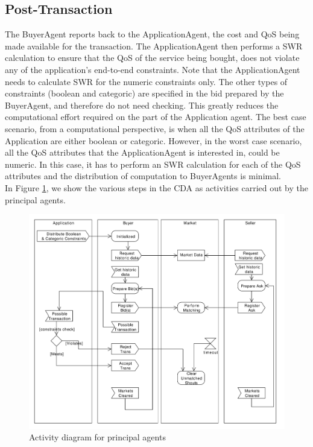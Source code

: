 \documentclass[10pt,journal,compsoc]{IEEEtran}
\begin{document}
\subsection{Post-Transaction}
The BuyerAgent reports back to the ApplicationAgent, the cost and QoS being made available for the transaction. The ApplicationAgent then performs a SWR calculation to ensure that the QoS of the service being bought, does not violate any of the application's end-to-end constraints. Note that the ApplicationAgent needs to calculate SWR for the numeric constraints only. The other types of constraints (boolean and categoric) are specified in the bid prepared by the BuyerAgent, and therefore do not need checking. This greatly reduces the computational effort required on the part of the Application agent. The best case scenario, from a computational perspective, is when all the QoS attributes of the Application are either boolean or categoric. However, in the worst case scenario, all the QoS attributes that the ApplicationAgent is  interested in, could be numeric. In this case, it has to perform an SWR calculation for each of the QoS attributes and the distribution of computation to BuyerAgents is minimal.\\

In Figure \ref{fig:cda_activity_diagram}, we show the various steps in the CDA  as activities carried out by the principal agents.
 
 \begin{figure}[h]
	\centering
	\includegraphics[scale=0.3]{drawings/CDA_Activity_Diagram.pdf}
	\caption{Activity diagram for principal agents}
	\label{fig:cda_activity_diagram}
\end{figure}	
\end{document}
